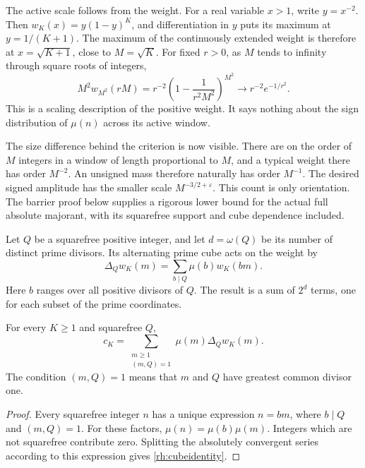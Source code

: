 The active scale follows from the weight. For a real variable \(x>1\), write \(y=x^{-2}\). Then \(w_K(x)=y(1-y)^K\), and differentiation in \(y\) puts its maximum at \(y=1/(K+1)\). The maximum of the continuously extended weight is therefore at \(x=\sqrt{K+1}\), close to \(M=\sqrt K\). For fixed \(r>0\), as \(M\) tends to infinity through square roots of integers,
\[
M^2w_{M^2}(rM)
=r^{-2}\left(1-\frac1{r^2M^2}\right)^{M^2}
\longrightarrow r^{-2}e^{-1/r^2}.
\]
This is a scaling description of the positive weight. It says nothing about the sign distribution of \(\mu(n)\) across its active window.

The size difference behind the criterion is now visible. There are on the order of \(M\) integers in a window of length proportional to \(M\), and a typical weight there has order \(M^{-2}\). An unsigned mass therefore naturally has order \(M^{-1}\). The desired signed amplitude has the smaller scale \(M^{-3/2+\varepsilon}\). This count is only orientation. The barrier proof below supplies a rigorous lower bound for the actual full absolute majorant, with its squarefree support and cube dependence included.

Let \(Q\) be a squarefree positive integer, and let \(d=\omega(Q)\) be its number of distinct prime divisors. Its alternating prime cube acts on the weight by
\begin{equation}\label{rh:deltaq}
\Delta_Qw_K(m)=\sum_{b\mid Q}\mu(b)w_K(bm).
\end{equation}
Here \(b\) ranges over all positive divisors of \(Q\). The result is a sum of \(2^d\) terms, one for each subset of the prime coordinates.

\begin{proposition}\label{rh:cube}
For every \(K\ge1\) and squarefree \(Q\),
\begin{equation}\label{rh:cubeidentity}
c_K=\sum_{\substack{m\ge1\\(m,Q)=1}}
\mu(m)\Delta_Qw_K(m).
\end{equation}
The condition \((m,Q)=1\) means that \(m\) and \(Q\) have greatest common divisor one.
\end{proposition}

\begin{proof}
Every squarefree integer \(n\) has a unique expression \(n=bm\), where \(b\mid Q\) and \((m,Q)=1\). For these factors, \(\mu(n)=\mu(b)\mu(m)\). Integers which are not squarefree contribute zero. Splitting the absolutely convergent series according to this expression gives \eqref{rh:cubeidentity}.
\end{proof}

